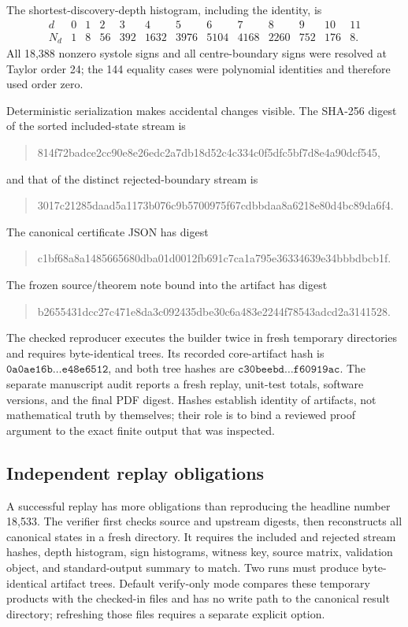 \documentclass[11pt,a4paper]{article}
\theoremstyle{definition}
\begin{document}
The shortest-discovery-depth histogram, including the identity, is
\[
\begin{array}{c|rrrrrrrrrrrr}
d&0&1&2&3&4&5&6&7&8&9&10&11\\\hline
N_d&1&8&56&392&1632&3976&5104&4168&2260&752&176&8.
\end{array}
\]
All 18,388 nonzero systole signs and all centre-boundary signs were resolved
at Taylor order 24; the 144 equality cases were polynomial identities and
therefore used order zero.

Deterministic serialization makes accidental changes visible.  The SHA-256
digest of the sorted included-state stream is
\begin{quote}\ttfamily\small
814f72badce2cc90e8e26edc2a7db18d52c4c334c0f5dfc5bf7d8e4a90dcf545,
\end{quote}
and that of the distinct rejected-boundary stream is
\begin{quote}\ttfamily\small
3017c21285daad5a1173b076c9b5700975f67cdbbdaa8a6218e80d4bc89da6f4.
\end{quote}
The canonical certificate JSON has digest
\begin{quote}\ttfamily\small
c1bf68a8a1485665680dba01d0012fb691c7ca1a795e36334639e34bbbdbcb1f.
\end{quote}
The frozen source/theorem note bound into the artifact has digest
\begin{quote}\ttfamily\small
b2655431dcc27c471e8da3c092435dbe30c6a483e2244f78543adcd2a3141528.
\end{quote}

The checked reproducer executes the builder twice in fresh temporary
directories and requires byte-identical trees.  Its recorded core-artifact
hash is
\(\texttt{0a0ae16b}\ldots\texttt{e48e6512}\), and both tree hashes are
\(\texttt{c30beebd}\ldots\texttt{f60919ac}\).  The separate manuscript audit
reports a fresh replay, unit-test totals, software versions, and the final PDF
digest.  Hashes establish identity of artifacts, not mathematical truth by
themselves; their role is to bind a reviewed proof argument to the exact
finite output that was inspected.

\subsection{Independent replay obligations}

A successful replay has more obligations than reproducing the headline
number 18,533.  The verifier first checks source and upstream digests, then
reconstructs all canonical states in a fresh directory.  It requires the
included and rejected stream hashes, depth histogram, sign histograms,
witness key, source matrix, validation object, and standard-output summary to
match.  Two runs must produce byte-identical artifact trees.  Default
verify-only mode compares these temporary products with the checked-in files
and has no write path to the canonical result directory; refreshing those
files requires a separate explicit option.
\end{document}
